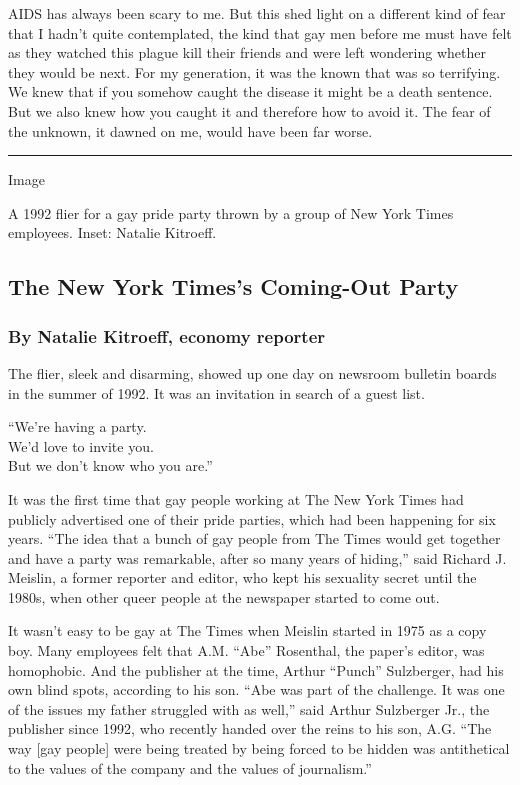 AIDS has always been scary to me. But this shed light on a different
kind of fear that I hadn't quite contemplated, the kind that gay men
before me must have felt as they watched this plague kill their friends
and were left wondering whether they would be next. For my generation,
it was the known that was so terrifying. We knew that if you somehow
caught the disease it might be a death sentence. But we also knew how
you caught it and therefore how to avoid it. The fear of the unknown, it
dawned on me, would have been far worse.

\begin{center}\rule{0.5\linewidth}{\linethickness}\end{center}

Image

A 1992 flier for a gay pride party thrown by a group of New York Times
employees. Inset: Natalie Kitroeff.

\hypertarget{the-new-york-timess-coming-out-party}{%
\subsection{The New York Times's Coming-Out
Party}\label{the-new-york-timess-coming-out-party}}

\hypertarget{by-natalie-kitroeff-economy-reporter}{%
\subsubsection{By Natalie Kitroeff, economy
reporter}\label{by-natalie-kitroeff-economy-reporter}}

The flier, sleek and disarming, showed up one day on newsroom bulletin
boards in the summer of 1992. It was an invitation in search of a guest
list.

``We're having a party.\\
We'd love to invite you.\\
But we don't know who you are.''

It was the first time that gay people working at The New York Times had
publicly advertised one of their pride parties, which had been happening
for six years. ``The idea that a bunch of gay people from The Times
would get together and have a party was remarkable, after so many years
of hiding,'' said Richard J. Meislin, a former reporter and editor, who
kept his sexuality secret until the 1980s, when other queer people at
the newspaper started to come out.

It wasn't easy to be gay at The Times when Meislin started in 1975 as a
copy boy. Many employees felt that A.M. ``Abe'' Rosenthal, the paper's
editor, was homophobic. And the publisher at the time, Arthur ``Punch''
Sulzberger, had his own blind spots, according to his son. ``Abe was
part of the challenge. It was one of the issues my father struggled with
as well,'' said Arthur Sulzberger Jr., the publisher since 1992, who
recently handed over the reins to his son, A.G. ``The way {[}gay
people{]} were being treated by being forced to be hidden was
antithetical to the values of the company and the values of
journalism.''


